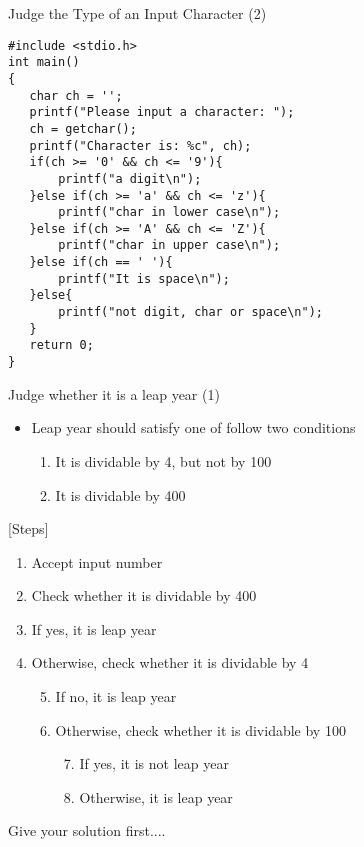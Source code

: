 \begin{frame}[fragile]{Judge the Type of an Input Character (2)}
\begin{lstlisting}[basicstyle=\footnotesize]
#include <stdio.h>
int main()
{
   char ch = '';
   printf("Please input a character: ");
   ch = getchar();
   printf("Character is: %c", ch);
   if(ch >= '0' && ch <= '9'){
       printf("a digit\n");
   }else if(ch >= 'a' && ch <= 'z'){
       printf("char in lower case\n");
   }else if(ch >= 'A' && ch <= 'Z'){
       printf("char in upper case\n");
   }else if(ch == ' '){
       printf("It is space\n");
   }else{
       printf("not digit, char or space\n");
   }
   return 0;
}
\end{lstlisting}

\end{frame}


\begin{frame}[fragile]{Judge whether it is a leap year (1)}
\begin{itemize}
	\item {Leap year should satisfy one of follow two conditions}
	\begin{enumerate}
		\item {It is dividable by 4, but not by 100}
		\item {It is dividable by 400}
	\end{enumerate}
\end{itemize}

[Steps]
\begin{enumerate}
	\setcounter{enumi}{0}
	\item {Accept input number}	
	\item {Check whether it is dividable by 400}
	\item {If yes, it is leap year}
	\item {Otherwise, check whether it is dividable by 4}
	\begin{enumerate}
	\setcounter{enumi}{4}
	\item {If no, it is leap year}
	\item {Otherwise, check whether it is dividable by 100}
	\begin{enumerate}
		\setcounter{enumi}{6}
		\item {If yes, it is not leap year}
		\item {Otherwise, it is leap year}
	\end{enumerate}
	\end{enumerate}
\end{enumerate}
Give your solution first....
\end{frame}

